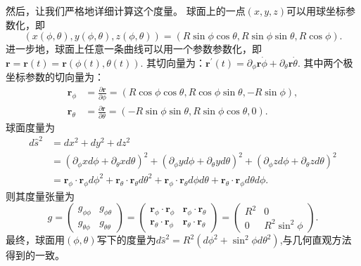 \documentclass{article}
\begin{document}
然后，让我们严格地详细计算这个度量。
球面上的一点$(x, y, z)$可以用球坐标参数化，即
\begin{equation*}
(x(\phi, \theta), y(\phi, \theta), z(\phi, \theta))=(R\sin\phi\cos\theta, R\sin\phi\sin\theta, R\cos\phi).
\end{equation*}
进一步地，球面上任意一条曲线可以用一个参数参数化，即$\mathbf{r}=\mathbf{r}(t)=\mathbf{r}(\phi(t), \theta(t))$.
其切向量为：$\mathbf{r}^{\prime}(t)=\partial_{\phi}\mathbf{r}\dot{\phi}+\partial_{\theta}\mathbf{r}\dot{\theta}$.
其中两个极坐标参数的切向量为：
\begin{equation}
\begin{aligned}
\mathbf{r}_{\phi}
&=\frac{\partial\mathbf{r}}{\partial\phi}
=\left(R\cos\phi\cos\theta, R\cos\phi\sin\theta, -R\sin\phi\right), \\
\mathbf{r}_{\theta}
&=\frac{\partial\mathbf{r}}{\partial\theta}
=\left(-R\sin\phi\sin\theta, R\sin\phi\cos\theta, 0\right).
\end{aligned}
\end{equation}
球面度量为
\begin{equation*}
\begin{aligned}
d\hat{s}^{2}
&=dx^{2}+dy^{2}+dz^{2} \\
&=\left(\partial_{\phi}{x}d\phi+\partial_{\theta}{x}d\theta\right)^{2}+\left(\partial_{\phi}{y}d\phi+\partial_{\theta}{y}d\theta\right)^{2}+\left(\partial_{\phi}{z}d\phi+\partial_{\theta}{z}d\theta\right)^{2} \\
&=\mathbf{r}_{\phi}\cdot\mathbf{r}_{\phi}d\phi^{2}+\mathbf{r}_{\theta}\cdot\mathbf{r}_{\theta}d\theta^{2}+\mathbf{r}_{\phi}\cdot\mathbf{r}_{\theta}d\phi{d}\theta+\mathbf{r}_{\theta}\cdot\mathbf{r}_{\phi}d\theta{d}\phi.
\end{aligned}
\end{equation*}
则其度量张量为
\begin{equation}
g=\begin{pmatrix}
g_{\phi\phi} & g_{\phi\theta} \\
g_{\theta\phi} & g_{\theta\theta}
\end{pmatrix}
=\begin{pmatrix}
\mathbf{r}_{\phi}\cdot\mathbf{r}_{\phi} & \mathbf{r}_{\phi}\cdot\mathbf{r}_{\theta} \\
\mathbf{r}_{\theta}\cdot\mathbf{r}_{\phi} & \mathbf{r}_{\theta}\cdot\mathbf{r}_{\theta}
\end{pmatrix}
=\begin{pmatrix}
R^{2} & 0 \\
0 & R^{2}\sin^{2}\phi
\end{pmatrix}.
\end{equation}
最终，球面用$(\phi, \theta)$写下的度量为$d\hat{s}^{2}=R^{2}\left(d\phi^{2}+\sin^{2}\phi{d}\theta^{2}\right)$,与几何直观方法得到的一致。
\end{document}
